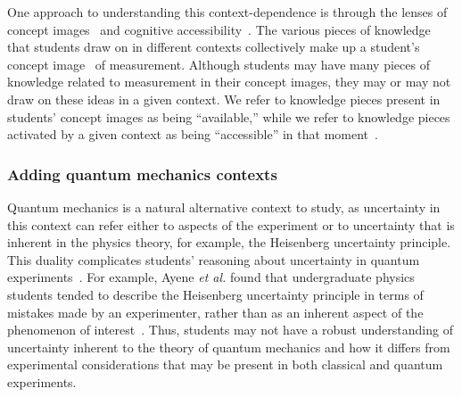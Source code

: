 \documentclass[english,aps,prstper,reprint,showpacs,longbibliography,superscriptaddress,nofootinbib]{revtex4-2}
\begin{document}
One approach to understanding this context-dependence is through the lenses of concept images~\cite{Tall1981,Schermerhorn2021} and cognitive accessibility~\cite{Heckler2018}. The various pieces of knowledge~\cite{Hammer2000} that students draw on in different contexts collectively make up a student's concept image~\cite{Tall1981,Schermerhorn2021} of measurement. Although students may have many pieces of knowledge related to measurement in their concept images, they may or may not draw on these ideas in a given context. We refer to knowledge pieces present in students' concept images as being ``available,'' while we refer to knowledge pieces activated by a given context as being ``accessible'' in that moment~\cite{Heckler2018}.

\subsubsection{Adding quantum mechanics contexts}

Quantum mechanics is a natural alternative context to study, as uncertainty in this context can refer either to aspects of the experiment or to uncertainty that is inherent in the physics theory, for example, the Heisenberg uncertainty principle. This duality complicates students' reasoning about uncertainty in quantum experiments~\cite{Ayene2011,KrijtenburgLewerissa2017,Singh2015,Zhu2012a,Bouchee2022,Johnston1998}. For example, Ayene \textit{et al.} found that undergraduate physics students tended to describe the Heisenberg uncertainty principle in terms of mistakes made by an experimenter, rather than as an inherent aspect of the phenomenon of interest~\cite{Ayene2011}. Thus, students may not have a robust understanding of uncertainty inherent to the theory of quantum mechanics and how it differs from experimental considerations that may be present in both classical and quantum experiments. 


\end{document}
